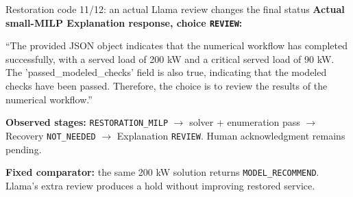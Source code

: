 \begin{frame}[t]{Restoration code 11/12: an actual Llama review changes the final status}
\deepdive
{}
\footnotesize
\textbf{Actual small-MILP Explanation response, choice \texttt{REVIEW}:}\par
``The provided JSON object indicates that the numerical workflow has completed successfully, with a served load of 200 kW and a critical served load of 90 kW. The 'passed\_modeled\_checks' field is also true, indicating that the modeled checks have been passed. Therefore, the choice is to review the results of the numerical workflow.''
\par\textbf{Observed stages:} \texttt{RESTORATION\_MILP} $\rightarrow$ solver + enumeration pass $\rightarrow$ Recovery \texttt{NOT\_NEEDED} $\rightarrow$ Explanation \texttt{REVIEW}. Human acknowledgment remains pending.
\par\textbf{Fixed comparator:} the same 200 kW solution returns \texttt{MODEL\_RECOMMEND}. Llama's extra review produces a hold without improving restored service.
\end{frame}

